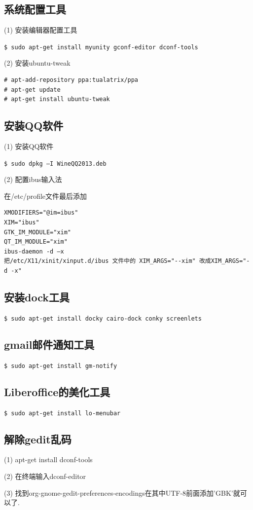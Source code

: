 \subsection{系统配置工具}
(1) 安装编辑器配置工具

\verb"$ sudo apt-get install myunity gconf-editor dconf-tools"

(2) 安装ubuntu-tweak
\begin{verbatim}
# apt-add-repository ppa:tualatrix/ppa
# apt-get update
# apt-get install ubuntu-tweak
\end{verbatim}

\subsection{安装QQ软件}
(1) 安装QQ软件

\verb"$ sudo dpkg –I WineQQ2013.deb"

(2) 配置ibus输入法

在/etc/profile文件最后添加
\begin{verbatim}
XMODIFIERS="@im=ibus"
XIM="ibus"
GTK_IM_MODULE="xim"
QT_IM_MODULE="xim"
ibus-daemon -d –x
把/etc/X11/xinit/xinput.d/ibus 文件中的 XIM_ARGS="--xim" 改成XIM_ARGS="-d -x"
\end{verbatim}

\subsection{安装dock工具}
\verb"$ sudo apt-get install docky cairo-dock conky screenlets"

\subsection{gmail邮件通知工具}
\verb"$ sudo apt-get install gm-notify"

\subsection{Liberoffice的美化工具}
\verb"$ sudo apt-get install lo-menubar"

\subsection{解除gedit乱码}
(1) apt-get install dconf-tools

(2) 在终端输入dconf-editor

(3) 找到org-gnome-gedit-preferences-encodings在其中UTF-8前面添加’GBK’就可以了.

